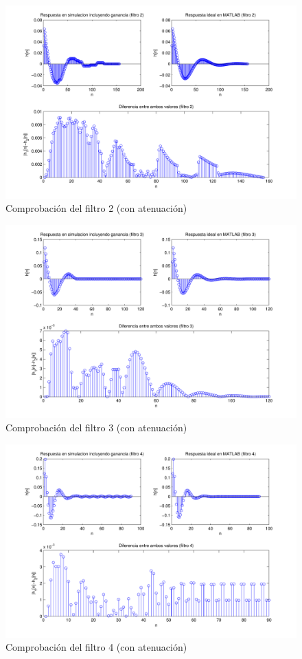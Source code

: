 \documentclass[a4paper,12pt]{article}
\begin{document}
\begin{figure}[hbt]
\includegraphics[width=\textwidth]{img/respfiltro2_gain.pdf} 
\caption{Comprobación del filtro 2 (con atenuación)} \label{fig:filter2_gain}
\end{figure}

\begin{figure}[hbt]
\includegraphics[width=\textwidth]{img/respfiltro3_gain.pdf} 
\caption{Comprobación del filtro 3 (con atenuación)} \label{fig:filter3_gain}
\end{figure}

\begin{figure}[hbt]
\includegraphics[width=\textwidth]{img/respfiltro4_gain.pdf} 
\caption{Comprobación del filtro 4 (con atenuación)} \label{fig:filter4_gain}
\end{figure}
\end{document}
